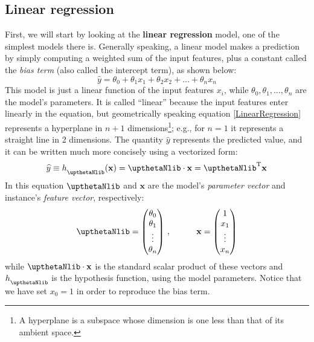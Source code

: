 \subsection{Linear regression}
First, we will start by looking at the \textbf{linear regression} model, one of the simplest models there is. Generally speaking, a linear model makes a prediction by simply computing a weighted sum of the input features, plus a constant called the \emph{bias term} (also called the intercept term), as shown below:
\begin{equation}\label{LinearRegression}
\widehat{y}=\theta_0+\theta_1x_1+\theta_2x_2+\ldots+\theta_nx_n
\end{equation}
This model is just a linear function of the input features $x_i$, while $\theta_0,\theta_1,\ldots,\theta_n$ are the model's parameters. It is called ``linear'' because the input features enter linearly in the equation, but geometrically speaking equation \eqref{LinearRegression} represents a hyperplane in $n+1$ dimensions\footnote{A hyperplane is a subspace whose dimension is one less than that of its ambient space.}; e.g., for $n=1$ it represents a straight line in 2 dimensions. The quantity $\widehat{y}$ represents the predicted value, and it can be written much more concisely using a vectorized form:
\begin{equation}\label{predictedvalue}
\widehat{y}\equiv h_{\boldtheta}(\mathbf{x})=\boldtheta\cdot\mathbf{x}=\boldtheta^{\mathrm{T}}\mathbf{x}
\end{equation}
In this equation $\boldtheta$ and $\mathbf{x}$ are the model's \emph{parameter vector} and instance's \emph{feature vector}, respectively:
\begin{equation}
\boldtheta=\begin{pmatrix}
\theta_0 \\
\theta_1 \\
\vdots \\
\theta_n
\end{pmatrix}\,,\qquad\quad
\mathbf{x}=\begin{pmatrix}
1 \\
x_1 \\
\vdots \\
x_n
\end{pmatrix}
\end{equation}
while $\boldtheta\cdot\mathbf{x}$ is the standard scalar product of these vectors and $ h_{\boldtheta}$ is the hypothesis function, using the model parameters. Notice that we have set $x_0=1$ in order to reproduce the bias term.


